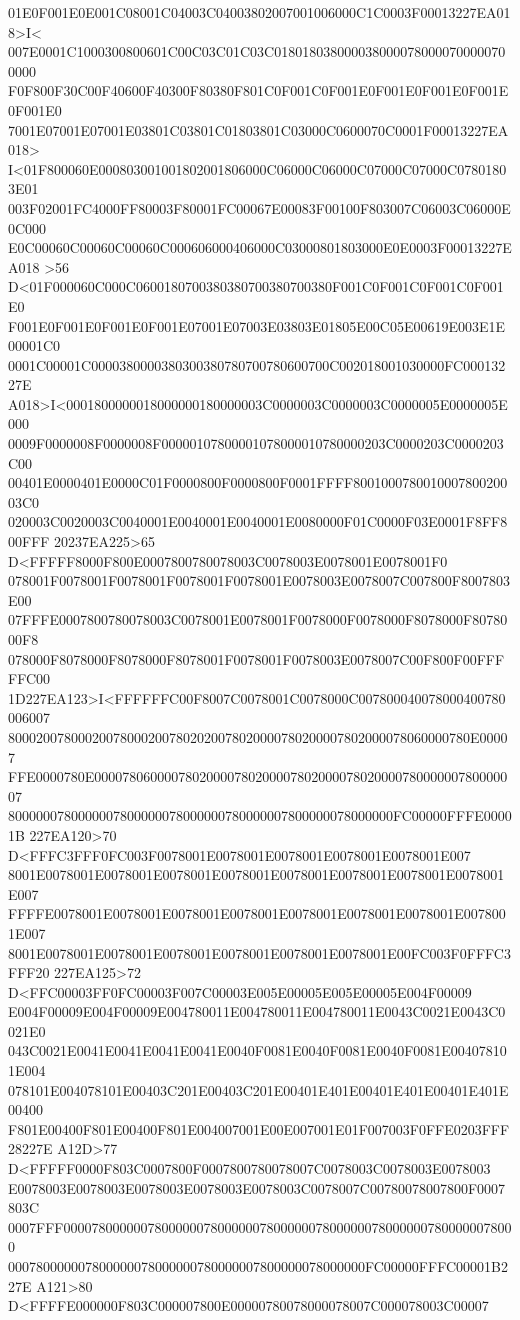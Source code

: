 01E0F001E0E001C08001C04003C04003802007001006000C1C0003F00013227EA018>I<
007E0001C1000300800601C00C03C01C03C0180180380000380000780000700000700000
F0F800F30C00F40600F40300F80380F801C0F001C0F001E0F001E0F001E0F001E0F001E0
7001E07001E07001E03801C03801C01803801C03000C0600070C0001F00013227EA018>
I<01F800060E000803001001802001806000C06000C06000C07000C07000C07801803E01
003F02001FC4000FF80003F80001FC00067E00083F00100F803007C06003C06000E0C000
E0C00060C00060C00060C000606000406000C03000801803000E0E0003F00013227EA018
>56 D<01F000060C000C0600180700380380700380700380F001C0F001C0F001C0F001E0
F001E0F001E0F001E0F001E07001E07003E03803E01805E00C05E00619E003E1E00001C0
0001C00001C0000380000380300380780700780600700C002018001030000FC00013227E
A018>I<0001800000018000000180000003C0000003C0000003C0000005E0000005E000
0009F0000008F0000008F00000107800001078000010780000203C0000203C0000203C00
00401E0000401E0000C01F0000800F0000800F0001FFFF800100078001000780020003C0
020003C0020003C0040001E0040001E0040001E0080000F01C0000F03E0001F8FF800FFF
20237EA225>65 D<FFFFF8000F800E0007800780078003C0078003E0078001E0078001F0
078001F0078001F0078001F0078001F0078001E0078003E0078007C007800F8007803E00
07FFFE0007800780078003C0078001E0078001F0078000F0078000F8078000F8078000F8
078000F8078000F8078000F8078001F0078001F0078003E0078007C00F800F00FFFFFC00
1D227EA123>I<FFFFFFC00F8007C0078001C0078000C007800040078000400780006007
800020078000200780002007802020078020000780200007802000078060000780E00007
FFE0000780E0000780600007802000078020000780200007802000078000000780000007
8000000780000007800000078000000780000007800000078000000FC00000FFFE00001B
227EA120>70 D<FFFC3FFF0FC003F0078001E0078001E0078001E0078001E0078001E007
8001E0078001E0078001E0078001E0078001E0078001E0078001E0078001E0078001E007
FFFFE0078001E0078001E0078001E0078001E0078001E0078001E0078001E0078001E007
8001E0078001E0078001E0078001E0078001E0078001E0078001E00FC003F0FFFC3FFF20
227EA125>72 D<FFC00003FF0FC00003F007C00003E005E00005E005E00005E004F00009
E004F00009E004F00009E004780011E004780011E004780011E0043C0021E0043C0021E0
043C0021E0041E0041E0041E0041E0040F0081E0040F0081E0040F0081E004078101E004
078101E004078101E00403C201E00403C201E00401E401E00401E401E00401E401E00400
F801E00400F801E00400F801E004007001E00E007001E01F007003F0FFE0203FFF28227E
A12D>77 D<FFFFF0000F803C0007800F0007800780078007C0078003C0078003E0078003
E0078003E0078003E0078003E0078003E0078003C0078007C00780078007800F0007803C
0007FFF00007800000078000000780000007800000078000000780000007800000078000
000780000007800000078000000780000007800000078000000FC00000FFFC00001B227E
A121>80 D<FFFFE000000F803C000007800E00000780078000078007C000078003C00007
